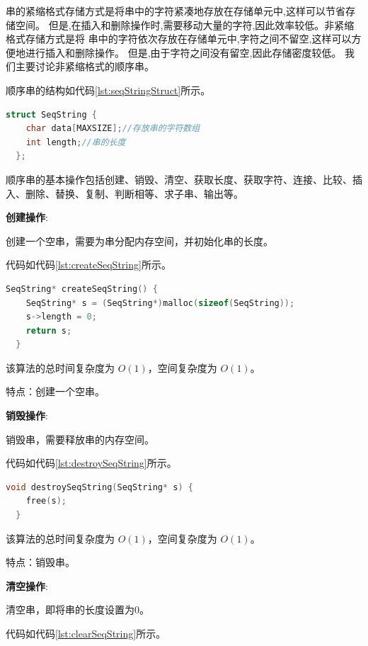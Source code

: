 \documentclass[lang=cn,newtx,10pt,scheme=chinese]{elegantbook}
\begin{document}
串的紧缩格式存储方式是将串中的字符紧凑地存放在存储单元中,这样可以节省存储空间。
但是,在插入和删除操作时,需要移动大量的字符,因此效率较低。非紧缩格式存储方式是将 串中的字符依次存放在存储单元中,字符之间不留空,这样可以方便地进行插入和删除操作。
但是,由于字符之间没有留空,因此存储密度较低。
我们主要讨论非紧缩格式的顺序串。

顺序串的结构如代码\ref{lst:seqStringStruct}所示。

\begin{lstlisting}[language=C++, caption={顺序串结构体定义}, label={lst:seqStringStruct}]
  struct SeqString {
    char data[MAXSIZE];//存放串的字符数组
    int length;//串的长度
  };
\end{lstlisting}

顺序串的基本操作包括创建、销毁、清空、获取长度、获取字符、连接、比较、插入、删除、替换、复制、判断相等、求子串、输出等。

\textbf{创建操作}:

创建一个空串，需要为串分配内存空间，并初始化串的长度。

代码如代码\ref{lst:createSeqString}所示。

\begin{lstlisting}[language=C++, caption={创建一个空串示例代码}, label={lst:createSeqString}]
  SeqString* createSeqString() {
    SeqString* s = (SeqString*)malloc(sizeof(SeqString));
    s->length = 0;
    return s;
  }

\end{lstlisting}

该算法的总时间复杂度为 $O(1)$，空间复杂度为 $O(1)$。

特点：创建一个空串。

\textbf{销毁操作}:

销毁串，需要释放串的内存空间。

代码如代码\ref{lst:destroySeqString}所示。

\begin{lstlisting}[language=C++, caption={销毁串示例代码}, label={lst:destroySeqString}]
  void destroySeqString(SeqString* s) {
    free(s);
  }

\end{lstlisting}

该算法的总时间复杂度为 $O(1)$，空间复杂度为 $O(1)$。

特点：销毁串。

\textbf{清空操作}:

清空串，即将串的长度设置为0。

代码如代码\ref{lst:clearSeqString}所示。
\end{document}
